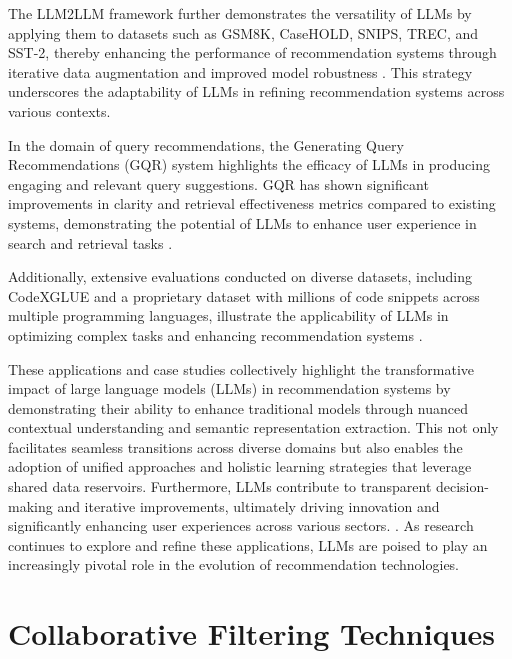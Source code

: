 The LLM2LLM framework further demonstrates the versatility of LLMs by applying them to datasets such as GSM8K, CaseHOLD, SNIPS, TREC, and SST-2, thereby enhancing the performance of recommendation systems through iterative data augmentation and improved model robustness \cite{lee2024llm2llmboostingllmsnovel}. This strategy underscores the adaptability of LLMs in refining recommendation systems across various contexts.



In the domain of query recommendations, the Generating Query Recommendations (GQR) system highlights the efficacy of LLMs in producing engaging and relevant query suggestions. GQR has shown significant improvements in clarity and retrieval effectiveness metrics compared to existing systems, demonstrating the potential of LLMs to enhance user experience in search and retrieval tasks \cite{bacciu2024generatingqueryrecommendationsllms}.



Additionally, extensive evaluations conducted on diverse datasets, including CodeXGLUE and a proprietary dataset with millions of code snippets across multiple programming languages, illustrate the applicability of LLMs in optimizing complex tasks and enhancing recommendation systems \cite{zhang2024llm}.



These applications and case studies collectively highlight the transformative impact of large language models (LLMs) in recommendation systems by demonstrating their ability to enhance traditional models through nuanced contextual understanding and semantic representation extraction. This not only facilitates seamless transitions across diverse domains but also enables the adoption of unified approaches and holistic learning strategies that leverage shared data reservoirs. Furthermore, LLMs contribute to transparent decision-making and iterative improvements, ultimately driving innovation and significantly enhancing user experiences across various sectors. \cite{vats2024exploring,xu2024prompting}. As research continues to explore and refine these applications, LLMs are poised to play an increasingly pivotal role in the evolution of recommendation technologies.











\section{Collaborative Filtering Techniques} \label{sec:Collaborative Filtering Techniques}

